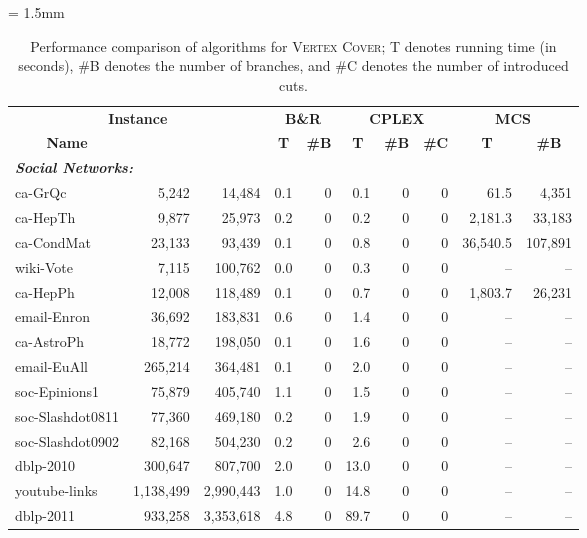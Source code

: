 \documentclass[11pt]{article}
\begin{document}
{
\tabcolsep = 1.5mm
\begin{table}[p]
\center
\caption{Performance comparison of algorithms for \textsc{Vertex Cover};
T denotes running time (in seconds), \#B denotes the number of branches, and \#C denotes the number of introduced cuts.}
\label{tbl:comparison_vc}
\fontsize{8pt}{0pt}\selectfont
\begin{tabular}{lrr|rr|rrr|rr}
\toprule
\multicolumn{3}{c|}{\textbf{Instance}} & \multicolumn{2}{c|}{\textbf{B\&R}}
 & \multicolumn{3}{c|}{\textbf{CPLEX}} &
\multicolumn{2}{c}{\textbf{MCS~\cite{clique/mcs_walcom10}}} \\
\multicolumn{1}{c}{\textbf{Name}} &
\multicolumn{1}{c}{\textbf{}} &
\multicolumn{1}{c|}{\textbf{}} &
\multicolumn{1}{c}{\textbf{T}} &
\multicolumn{1}{c|}{\textbf{\#B}} &
\multicolumn{1}{c}{\textbf{T}} &
\multicolumn{1}{c}{\textbf{\#B}} &
\multicolumn{1}{c|}{\textbf{\#C}} &
\multicolumn{1}{c}{\textbf{T}} &
\multicolumn{1}{c}{\textbf{\#B}} \\
\midrule
\multicolumn{4}{l}{\textbf{\textit{Social Networks:}}} \\
ca-GrQc & 5,242 & 14,484 & 0.1 & 0 & 0.1 & 0 & 0 & 61.5 & 4,351 \\
ca-HepTh & 9,877 & 25,973 & 0.2 & 0 & 0.2 & 0 & 0 & 2,181.3 & 33,183 \\
ca-CondMat & 23,133 & 93,439 & 0.1 & 0 & 0.8 & 0 & 0 & 36,540.5 & 107,891 \\
wiki-Vote & 7,115 & 100,762 & 0.0 & 0 & 0.3 & 0 & 0 & -- & -- \\
ca-HepPh & 12,008 & 118,489 & 0.1 & 0 & 0.7 & 0 & 0 & 1,803.7 & 26,231 \\
email-Enron & 36,692 & 183,831 & 0.6 & 0 & 1.4 & 0 & 0 & -- & -- \\
ca-AstroPh & 18,772 & 198,050 & 0.1 & 0 & 1.6 & 0 & 0 & -- & -- \\
email-EuAll & 265,214 & 364,481 & 0.1 & 0 & 2.0 & 0 & 0 & -- & -- \\
soc-Epinions1 & 75,879 & 405,740 & 1.1 & 0 & 1.5 & 0 & 0 & -- & -- \\
soc-Slashdot0811 & 77,360 & 469,180 & 0.2 & 0 & 1.9 & 0 & 0 & -- & -- \\
soc-Slashdot0902 & 82,168 & 504,230 & 0.2 & 0 & 2.6 & 0 & 0 & -- & -- \\
dblp-2010 & 300,647 & 807,700 & 2.0 & 0 & 13.0 & 0 & 0 & -- & -- \\
youtube-links & 1,138,499 & 2,990,443 & 1.0 & 0 & 14.8 & 0 & 0 & -- & -- \\
dblp-2011 & 933,258 & 3,353,618 & 4.8 & 0 & 89.7 & 0 & 0 & -- & -- \\

\end{tabular}
\end{table}}
\end{document}
